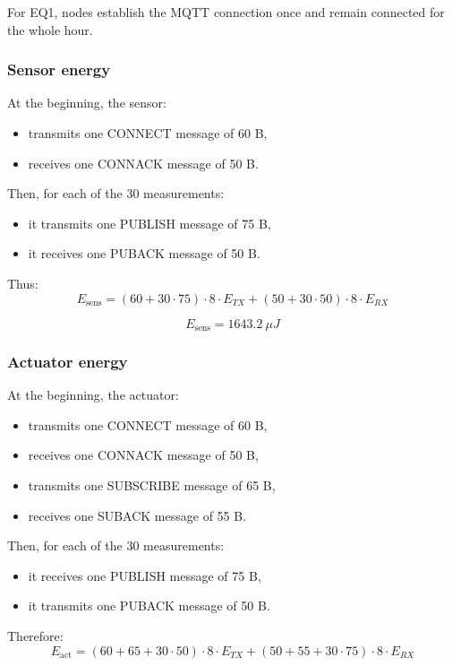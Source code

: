\documentclass[a4paper,12pt]{article}
\begin{document}
For EQ1, nodes establish the MQTT connection once and remain connected for the whole hour.

\subsubsection*{Sensor energy}

At the beginning, the sensor:
\begin{itemize}[leftmargin=1.5cm]
    \item transmits one CONNECT message of 60 B,
    \item receives one CONNACK message of 50 B.
\end{itemize}

Then, for each of the 30 measurements:
\begin{itemize}[leftmargin=1.5cm]
    \item it transmits one PUBLISH message of 75 B,
    \item it receives one PUBACK message of 50 B.
\end{itemize}

Thus:
\[
E_{\text{sens}} =
(60 + 30 \cdot 75)\cdot 8 \cdot E_{TX}
+
(50 + 30 \cdot 50)\cdot 8 \cdot E_{RX}
\]

\[
E_{\text{sens}} = 1643.2 \ \mu J
\]

\subsubsection*{Actuator energy}

At the beginning, the actuator:
\begin{itemize}[leftmargin=1.5cm]
    \item transmits one CONNECT message of 60 B,
    \item receives one CONNACK message of 50 B,
    \item transmits one SUBSCRIBE message of 65 B,
    \item receives one SUBACK message of 55 B.
\end{itemize}

Then, for each of the 30 measurements:
\begin{itemize}[leftmargin=1.5cm]
    \item it receives one PUBLISH message of 75 B,
    \item it transmits one PUBACK message of 50 B.
\end{itemize}

Therefore:
\[
E_{\text{act}} =
(60 + 65 + 30 \cdot 50)\cdot 8 \cdot E_{TX}
+
(50 + 55 + 30 \cdot 75)\cdot 8 \cdot E_{RX}
\]
\end{document}
